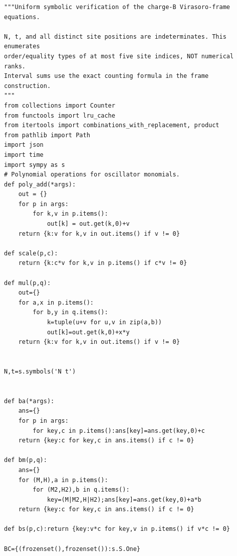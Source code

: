\documentclass[11pt,a4paper]{article}
\numberwithin{equation}{section}
\theoremstyle{definition}\newtheorem{definition}[theorem]{Definition}
\theoremstyle{remark}\newtheorem{remark}[theorem]{Remark}
\begin{document}
\begin{lstlisting}
"""Uniform symbolic verification of the charge-B Virasoro-frame equations.

N, t, and all distinct site positions are indeterminates. This enumerates
order/equality types of at most five site indices, NOT numerical ranks.
Interval sums use the exact counting formula in the frame construction.
"""
from collections import Counter
from functools import lru_cache
from itertools import combinations_with_replacement, product
from pathlib import Path
import json
import time
import sympy as s
# Polynomial operations for oscillator monomials.
def poly_add(*args):
    out = {}
    for p in args:
        for k,v in p.items():
            out[k] = out.get(k,0)+v
    return {k:v for k,v in out.items() if v != 0}

def scale(p,c):
    return {k:c*v for k,v in p.items() if c*v != 0}

def mul(p,q):
    out={}
    for a,x in p.items():
        for b,y in q.items():
            k=tuple(u+v for u,v in zip(a,b))
            out[k]=out.get(k,0)+x*y
    return {k:v for k,v in out.items() if v != 0}


N,t=s.symbols('N t')


def ba(*args):
    ans={}
    for p in args:
        for key,c in p.items():ans[key]=ans.get(key,0)+c
    return {key:c for key,c in ans.items() if c != 0}

def bm(p,q):
    ans={}
    for (M,H),a in p.items():
        for (M2,H2),b in q.items():
            key=(M|M2,H|H2);ans[key]=ans.get(key,0)+a*b
    return {key:c for key,c in ans.items() if c != 0}

def bs(p,c):return {key:v*c for key,v in p.items() if v*c != 0}

BC={(frozenset(),frozenset()):s.S.One}



\end{lstlisting}
\end{document}
